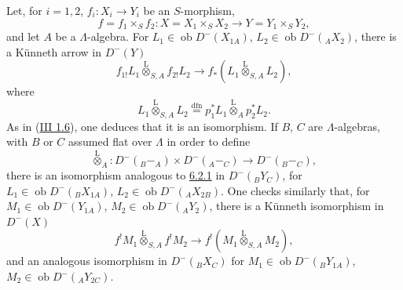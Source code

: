 \documentclass[11pt]{article}
\providecommand{\lten}{\overset{\mathrm L}{\otimes}}
\providecommand{\Ob}{\operatorname{ob}}
\providecommand{\lten}{\overset{\mathrm L}{\otimes}}
\providecommand{\lten}{\overset{\mathrm L}{\otimes}}
\providecommand{\Ob}{\operatorname{ob}}
\providecommand{\lten}{\overset{\mathrm L}{\otimes}}
\providecommand{\lten}{\overset{\mathrm L}{\otimes}}
\providecommand{\Ob}{\operatorname{Ob}}
\providecommand{\lten}{\overset{\mathrm L}{\otimes}}
\providecommand{\Ob}{\operatorname{ob}}
\providecommand{\Ob}{\operatorname{Ob}}
\providecommand{\lten}{\overset{\mathrm L}{\otimes}}
\begin{document}
Let, for $i=1,2$, $f_i:X_i\to Y_i$ be an $S$-morphism,
\[
f=f_1\times_S f_2:X=X_1\times_SX_2\longrightarrow Y=Y_1\times_SY_2,
\]
and let $A$ be a $\Lambda$-algebra. For $L_1\in\Ob D^-(X_{1A})$, $L_2\in\Ob D^-({}_AX_2)$, there is a Künneth arrow in $D^-(Y)$
\begin{equation}
f_{1!}L_1\lten_{S,A}f_{2!}L_2
\longrightarrow
f_*(L_1\lten_{S,A}L_2),
\tag{6.2.1}\label{sga5:IIIB:equation:6.2.1}
\end{equation}
where
\[
L_1\lten_{S,A}L_2
\stackrel{\mathrm{dfn}}{=}p_1^*L_1\lten_Ap_2^*L_2.
\]
As in (\hyperref[sga5:III:subsection:1.6]{III 1.6}), one deduces that it is an isomorphism. If $B$, $C$ are $\Lambda$-algebras, with $B$ or $C$ assumed flat over $\Lambda$ in order to define
\[
\lten_A:D^-({}_B{-}_A)\times D^-({}_A{-}_C)\longrightarrow D^-({}_B{-}_C),
\]
there is an isomorphism analogous to \hyperref[sga5:IIIB:equation:6.2.1]{6.2.1} in $D^-({}_BY_C)$, for $L_1\in\Ob D^-({}_BX_{1A})$, $L_2\in\Ob D^-({}_AX_{2B})$. One checks similarly that, for $M_1\in\Ob D^-(Y_{1A})$, $M_2\in\Ob D^-({}_AY_2)$, there is a Künneth isomorphism in $D^-(X)$
\begin{equation}
f^!M_1\lten_{S,A}f^!M_2
\longrightarrow
f^!(M_1\lten_{S,A}M_2),
\tag{6.2.2}\label{sga5:IIIB:equation:6.2.2}
\end{equation}
and an analogous isomorphism in $D^-({}_B X_C)$ for $M_1\in\Ob D^-({}_BY_{1A})$, $M_2\in\Ob D^-({}_AY_{2C})$.
\end{document}
